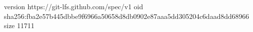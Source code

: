 version https://git-lfs.github.com/spec/v1
oid sha256:fba2e57b445dbbe9f6966a50658d8db0902e87aaa5dd305204c6daad8dd68966
size 11711
